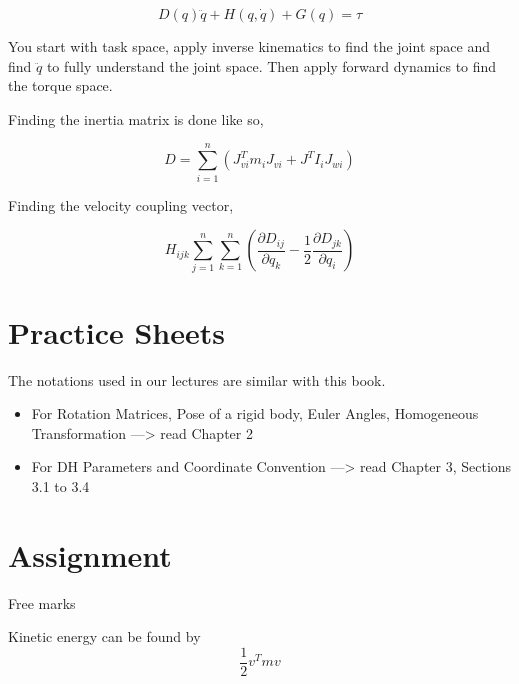 \documentclass[11pt]{report}
\begin{document}
$$D(q) \ddot{q} + H(q,\dot{q}) + G(q) = \tau$$

You start with task space, apply inverse kinematics to find the joint space and find \(\ddot{q}\) to fully understand the joint space. Then apply forward dynamics to find the torque space.

Finding the inertia matrix is done like so,

$$D = \sum_{i=1}^n(J^T_{vi} m_i J_{vi} + J^T I_i J_{wi})$$

Finding the velocity coupling vector,

$$H_{ijk}\sum_{j=1}^n\sum_{k=1}^n(\frac{\partial D_{ij}}{\partial q_k} - \frac{1}{2}\frac{\partial D_{jk}}{\partial q_i})$$
\part{Practice Sheets}
\label{sec:orgec109a1}
The notations used in our lectures are similar with this book.

\begin{itemize}
\item For Rotation Matrices, Pose of a rigid body, Euler Angles, Homogeneous Transformation ---> read Chapter 2
\item For DH Parameters and Coordinate Convention ---> read Chapter 3, Sections 3.1 to 3.4
\end{itemize}
\part{Assignment}
\label{sec:org57db669}
Free marks

Kinetic energy can be found by $$\frac{1}{2} v^T m v$$
\end{document}
